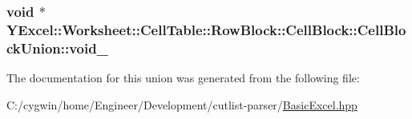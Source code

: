 \subsubsection[{void\+\_\+}]{\setlength{\rightskip}{0pt plus 5cm}void $\ast$ Y\+Excel\+::\+Worksheet\+::\+Cell\+Table\+::\+Row\+Block\+::\+Cell\+Block\+::\+Cell\+Block\+Union\+::void\+\_\+}\label{union_y_excel_1_1_worksheet_1_1_cell_table_1_1_row_block_1_1_cell_block_1_1_cell_block_union_aa81e0d20568b050fb3443952ce232533}


The documentation for this union was generated from the following file\+:\begin{DoxyCompactItemize}
\item 
C\+:/cygwin/home/\+Engineer/\+Development/cutlist-\/parser/\hyperlink{_basic_excel_8hpp}{Basic\+Excel.\+hpp}\end{DoxyCompactItemize}
